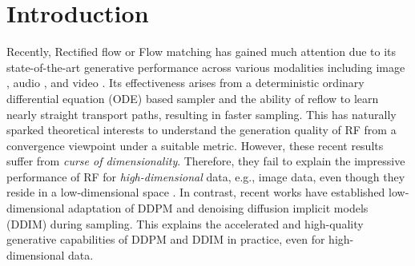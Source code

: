 \documentclass{article}
\theoremstyle{plain}
\theoremstyle{definition}
\theoremstyle{remark}
\begin{document}
\section{Introduction}
Recently, Rectified flow or Flow matching \cite{liu2022rectified, lipman2022flow} has gained much attention due to its state-of-the-art generative performance across various modalities including image \citep{liu2023instaflow, yan2024perflow}, audio \citep{ audio_RF_wang2024frieren, audio_RF_liu2025flashaudio}, and video \citep{video_RF_chen2025goku, video_RF_liu2025improving}. 
Its effectiveness arises from a deterministic ordinary differential equation (ODE) based sampler and the ability of reflow to learn nearly straight transport paths, resulting in faster sampling. This has naturally sparked theoretical interests \cite{bansal2025wasserstein, guan2025mirror, zhou2025an} to understand the generation quality of RF from a convergence viewpoint under a suitable metric. However, these recent results suffer from \textit{curse of dimensionality}. Therefore, they fail to explain the impressive performance of RF for \textit{high-dimensional} data, e.g., image data, even though they reside in a low-dimensional space \cite{ansuini2019intrinsic, pope2021intrinsic}. In contrast, recent works \citep{potaptchik2024linear, azangulov2024convergence,huang2024denoising,li2024adapting,liang2025low} have established low-dimensional adaptation of DDPM and denoising diffusion implicit models (DDIM)  during sampling. This explains the accelerated and high-quality generative capabilities of DDPM and DDIM in practice, even for high-dimensional data.
\end{document}
